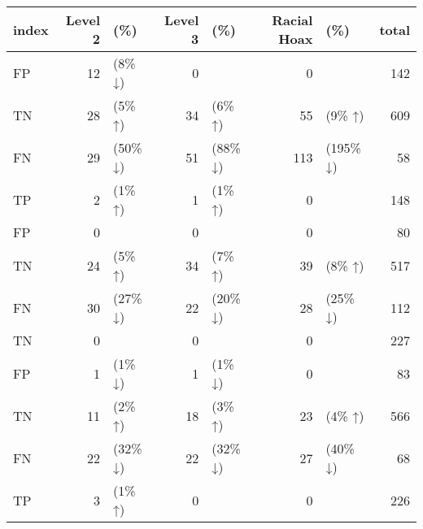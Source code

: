 \begin{tabular}{lrlrlrlr}
\toprule
index & Level 2 & (\%) & Level 3 & (\%) & Racial Hoax & (\%) & total \\
\midrule
FP & 12 & (8\% ↓) & 0 &  & 0 &  & 142 \\
TN & 28 & (5\% ↑) & 34 & (6\% ↑) & 55 & (9\% ↑) & 609 \\
FN & 29 & (50\% ↓) & 51 & (88\% ↓) & 113 & (195\% ↓) & 58 \\
TP & 2 & (1\% ↑) & 1 & (1\% ↑) & 0 &  & 148 \\
FP & 0 &  & 0 &  & 0 &  & 80 \\
TN & 24 & (5\% ↑) & 34 & (7\% ↑) & 39 & (8\% ↑) & 517 \\
FN & 30 & (27\% ↓) & 22 & (20\% ↓) & 28 & (25\% ↓) & 112 \\
TN & 0 &  & 0 &  & 0 &  & 227 \\
FP & 1 & (1\% ↓) & 1 & (1\% ↓) & 0 &  & 83 \\
TN & 11 & (2\% ↑) & 18 & (3\% ↑) & 23 & (4\% ↑) & 566 \\
FN & 22 & (32\% ↓) & 22 & (32\% ↓) & 27 & (40\% ↓) & 68 \\
TP & 3 & (1\% ↑) & 0 &  & 0 &  & 226 \\
\bottomrule
\end{tabular}
